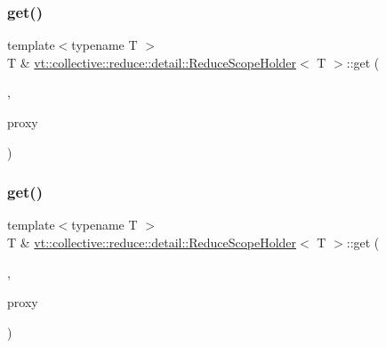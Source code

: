 \mbox{\label{structvt_1_1collective_1_1reduce_1_1detail_1_1_reduce_scope_holder_accca4de877182ade06a16d3954590e51}} 
\subsubsection{\texorpdfstring{get()}{get()}\hspace{0.1cm}{\footnotesize\ttfamily [2/6]}}
{\footnotesize\ttfamily template$<$typename T $>$ \\
T \& \hyperlink{structvt_1_1collective_1_1reduce_1_1detail_1_1_reduce_scope_holder}{vt\+::collective\+::reduce\+::detail\+::\+Reduce\+Scope\+Holder}$<$ T $>$\+::get (\begin{DoxyParamCaption}\item[{\hyperlink{structvt_1_1collective_1_1reduce_1_1detail_1_1_reduce_scope_holder_1_1_obj_group_tag}{Obj\+Group\+Tag}}]{,  }\item[{\hyperlink{namespacevt_ad7cae989df485fccca57f0792a880a8e}{Obj\+Group\+Proxy\+Type}}]{proxy }\end{DoxyParamCaption})}

\mbox{\label{structvt_1_1collective_1_1reduce_1_1detail_1_1_reduce_scope_holder_aa20f0ff351bc6bcccea68e8cd4651969}} 
\subsubsection{\texorpdfstring{get()}{get()}\hspace{0.1cm}{\footnotesize\ttfamily [3/6]}}
{\footnotesize\ttfamily template$<$typename T $>$ \\
T \& \hyperlink{structvt_1_1collective_1_1reduce_1_1detail_1_1_reduce_scope_holder}{vt\+::collective\+::reduce\+::detail\+::\+Reduce\+Scope\+Holder}$<$ T $>$\+::get (\begin{DoxyParamCaption}\item[{\hyperlink{structvt_1_1collective_1_1reduce_1_1detail_1_1_reduce_scope_holder_1_1_vrt_proxy_tag}{Vrt\+Proxy\+Tag}}]{,  }\item[{\hyperlink{namespacevt_a1b417dd5d684f045bb58a0ede70045ac}{Virtual\+Proxy\+Type}}]{proxy }\end{DoxyParamCaption})}

